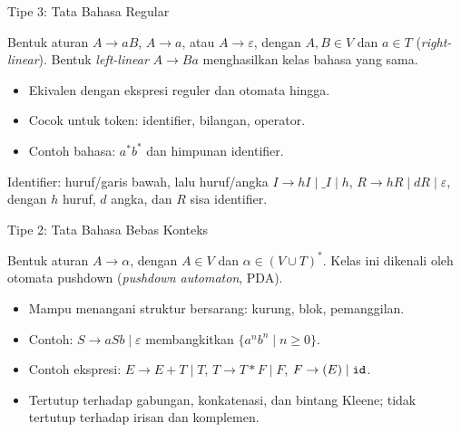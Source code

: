 \documentclass[aspectratio=169,10pt,t]{beamer}
\begin{document}
\begin{frame}{Tipe 3: Tata Bahasa Regular}
  \begin{block}{Bentuk aturan}
    \small
    \(A \to aB\), \(A \to a\), atau \(A \to \varepsilon\), dengan
    \(A,B \in V\) dan \(a \in T\) (\textit{right-linear}). Bentuk
    \textit{left-linear} \(A \to Ba\) menghasilkan kelas bahasa yang
    sama.
  \end{block}

  \begin{itemize}
    \item Ekivalen dengan ekspresi reguler dan otomata hingga.
    \item Cocok untuk token: identifier, bilangan, operator.
    \item Contoh bahasa: \(a^{*}b^{*}\) dan himpunan identifier.
  \end{itemize}

  \vspace{2pt}
  \begin{exampleblock}{Identifier: huruf/garis bawah, lalu huruf/angka}
    \footnotesize
    \(I \to hI \mid \_I \mid h\), \quad
    \(R \to hR \mid dR \mid \varepsilon\),\\
    dengan \(h\) huruf, \(d\) angka, dan \(R\) sisa identifier.
  \end{exampleblock}
\end{frame}

\begin{frame}{Tipe 2: Tata Bahasa Bebas Konteks}
  \begin{block}{Bentuk aturan}
    \small
    \(A \to \alpha\), dengan \(A \in V\) dan
    \(\alpha \in (V \cup T)^{*}\). Kelas ini dikenali oleh otomata
    pushdown (\textit{pushdown automaton}, PDA).
  \end{block}

  \begin{itemize}
    \item Mampu menangani struktur bersarang: kurung, blok, pemanggilan.
    \item Contoh: \(S \to aSb \mid \varepsilon\) membangkitkan
          \(\{a^n b^n \mid n \ge 0\}\).
    \item Contoh ekspresi:
          \(E \to E+T \mid T\), \(T \to T*F \mid F\),
          \(F \to (E) \mid \texttt{id}\).
    \item Tertutup terhadap gabungan, konkatenasi, dan bintang Kleene;
          tidak tertutup terhadap irisan dan komplemen.
  \end{itemize}
\end{frame}
\end{document}
